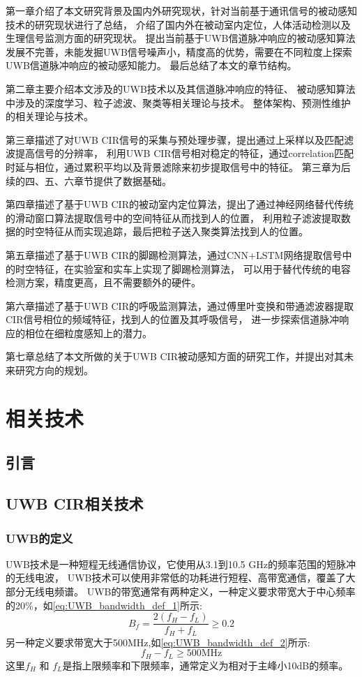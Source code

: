 第一章介绍了本文研究背景及国内外研究现状，针对当前基于通讯信号的被动感知技术的研究现状进行了总结，
介绍了国内外在被动室内定位，人体活动检测以及生理信号监测方面的研究现状。
提出当前基于UWB信道脉冲响应的被动感知算法发展不完善，未能发掘UWB信号噪声小，精度高的优势，需要在不同粒度上探索UWB信道脉冲响应的被动感知能力。
最后总结了本文的章节结构。

第二章主要介绍本文涉及的UWB技术以及其信道脉冲响应的特征、
被动感知算法中涉及的深度学习、粒子滤波、聚类等相关理论与技术。
整体架构、预测性维护的相关理论与技术。

第三章描述了对UWB CIR信号的采集与预处理步骤，提出通过上采样以及匹配滤波提高信号的分辨率，
利用UWB CIR信号相对稳定的特征，通过correlation匹配时延与相位，通过累积平均以及背景滤除来初步提取信号中的特征。
第三章为后续的四、五、六章节提供了数据基础。

第四章描述了基于UWB CIR的被动室内定位算法，提出了通过神经网络替代传统的滑动窗口算法提取信号中的空间特征从而找到人的位置，
利用粒子滤波提取数据的时空特征从而实现追踪，最后把粒子送入聚类算法找到人的位置。

第五章描述了基于UWB CIR的脚踢检测算法，通过CNN+LSTM网络提取信号中的时空特征，在实验室和实车上实现了脚踢检测算法，
可以用于替代传统的电容检测方案，精度更高，且不需要额外的硬件。

第六章描述了基于UWB CIR的呼吸监测算法，通过傅里叶变换和带通滤波器提取CIR信号相位的频域特征，找到人的位置及其呼吸信号，
进一步探索信道脉冲响应的相位在细粒度感知上的潜力。

第七章总结了本文所做的关于UWB CIR被动感知方面的研究工作，并提出对其未来研究方向的规划。
\chapter{相关技术}
\section{引言}
\section{UWB CIR相关技术}
\subsection{UWB的定义}
UWB技术是一种短程无线通信协议，它使用从3.1到10.5 GHz的频率范围的短脉冲的无线电波，
UWB技术可以使用非常低的功耗进行短程、高带宽通信，覆盖了大部分无线电频谱。
UWB的带宽通常有两种定义，一种定义要求带宽大于中心频率的20\%，如\ref{eq:UWB_bandwidth_def_1}所示:
\begin{equation}\label{eq:UWB_bandwidth_def_1}
    B_f=\frac{2\left(f_H-f_L\right)}{f_H+f_L} \geq 0.2
\end{equation}
另一种定义要求带宽大于500MHz,如\ref{eq:UWB_bandwidth_def_2}所示:
\begin{equation}\label{eq:UWB_bandwidth_def_2}
    f_H-f_L \geq 500 \mathrm{MHz}
\end{equation}
这里\(f_H\) 和 \(f_L\)是指上限频率和下限频率，通常定义为相对于主峰小10dB的频率\cite{UWB_Characteristics}。

